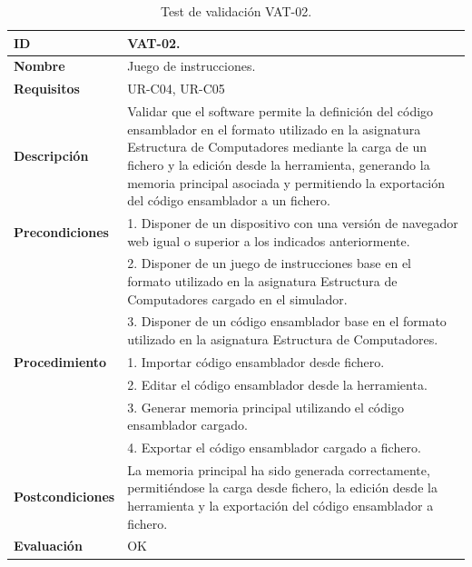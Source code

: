 \begin{center}
\begin{table}[htb]
\centering
\begin{tabular}{@{}p{2.5cm} p{9cm}@{}} 
\toprule
\textbf{ID} 					& VAT-02. \\
\midrule
\textbf{Nombre} 				& Juego de instrucciones. \\
\midrule
\textbf{Requisitos} 		& UR-C04, UR-C05 \\
\midrule
\textbf{Descripción} 		& Validar que el software permite la definición del código ensamblador en el formato utilizado en la asignatura Estructura de Computadores mediante la carga de un fichero y la edición desde la herramienta, generando la memoria principal asociada y permitiendo la exportación del código ensamblador a un fichero. \\
\midrule
\textbf{Precondiciones}		& 1. Disponer de un dispositivo con una versión de navegador web igual o superior a los indicados anteriormente. \\
											& 2. Disponer de un juego de instrucciones base en el formato utilizado en la asignatura Estructura de Computadores cargado en el simulador. \\
											& 3. Disponer de un código ensamblador base en el formato utilizado en la asignatura Estructura de Computadores. \\
\midrule
\textbf{Procedimiento}		& 1. Importar código ensamblador desde fichero.\\
											& 2. Editar el código ensamblador desde la herramienta.\\
											& 3. Generar memoria principal utilizando el código ensamblador cargado.\\
											& 4. Exportar el código ensamblador cargado a fichero. \\
\midrule
\textbf{Postcondiciones} 		&  La memoria principal ha sido generada correctamente, permitiéndose la carga desde fichero, la edición desde la herramienta y la exportación del código ensamblador a fichero.\\
\midrule
\textbf{Evaluación} 			& OK \\
\bottomrule
\end{tabular}
\caption{Test de validación VAT-02.}
\label{tab:vat-02}
\end{table}
\end{center}

